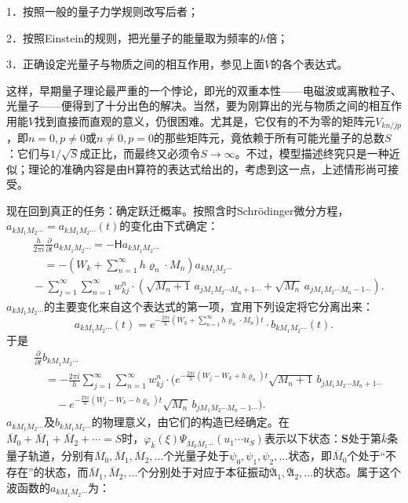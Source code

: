 \documentclass[fontsize=13pt,twoside,openany,headings=normal,parskip=false,bookmarkpackage=false,DIV=calc]{scrbook}
\begin{document}
1．按照一般的量子力学规则改写后者；

2．按照Einstein的规则，把光量子的能量取为频率的$h$倍；

3．正确设定光量子与物质之间的相互作用，参见上面$V$的各个表达式。

这样，早期量子理论最严重的一个悖论，即光的双重本性——电磁波或离散粒子、光量子——便得到了十分出色的解决。当然，要为刚算出的光与物质之间的相互作用能$V$找到直接而直观的意义，仍很困难。尤其是，它仅有的不为零的矩阵元$V_{kn/jp}$，即$n=0,\allowbreak p\ne0$或$n\ne0,\allowbreak p=0$的那些矩阵元，竟依赖于所有可能光量子的总数$S$：它们与$1/\sqrt S$成正比，而最终又必须令$S\longrightarrow\infty$。不过，模型描述终究只是一种近似；理论的准确内容是由$\mathsf{H}$算符的表达式给出的，考虑到这一点，上述情形尚可接受。

现在回到真正的任务：确定跃迁概率。按照含时Schrödinger微分方程，$a_{kM_1M_2\cdots}=a_{kM_1M_2\cdots}(t)$的变化由下式确定：
\begin{align*}
 &\frac h{2\pi i}\frac\partial{\partial t}a_{kM_1M_2\cdots}=-\mathsf{H}a_{kM_1M_2\cdots}\\
 &\quad=-\left(W_k+\sum_{n=1}^{\infty}h\varrho_n\cdot M_n\right)a_{kM_1M_2\cdots}\\
 &{}-\sum_{j=1}^{\infty}\sum_{n=1}^{\infty}w_{kj}^n\cdot
 \left(\sqrt{M_n+1}\,a_{jM_1M_2\cdots M_n+1\cdots}
 +\sqrt{M_n}\,a_{jM_1M_2\cdots M_n-1\cdots}\right).
\end{align*}\hypertarget{origpage-151}{}\label{origpage-151}$a_{kM_1M_2\cdots}$的主要变化来自这个表达式的第一项，宜用下列设定将它分离出来：
\[
 a_{kM_1M_2\cdots}(t)=e^{-\frac{2\pi i}{h}(W_k+\sum_{n=1}^{\infty}h\varrho_n\cdot M_n)t}\cdot b_{kM_1M_2\cdots}(t).
\]
于是
\begin{align*}
 &\frac\partial{\partial t}b_{kM_1M_2\cdots}\\
 &\quad=-\frac{2\pi i}{h}\sum_{j=1}^{\infty}\sum_{n=1}^{\infty}w_{kj}^n\cdot
 \bigl(e^{-\frac{2\pi i}{h}(W_j-W_k+h\varrho_n)t}\sqrt{M_n+1}\,b_{jM_1M_2\cdots M_n+1\cdots}\\
 &\qquad{}-e^{-\frac{2\pi i}{h}(W_j-W_k-h\varrho_n)t}\sqrt{M_n}\,b_{jM_1M_2\cdots M_n-1\cdots}\bigr).
\end{align*}
$a_{kM_1M_2\cdots}$及$b_{kM_1M_2\cdots}$的物理意义，由它们的构造已经确定。在$\overline M_0+\overline M_1+\overline M_2+\cdots=S$时，$\varphi_{\bar k}(\xi)\Psi_{\overline M_0\overline M_1\cdots}(u_1\cdots u_S)$表示以下状态：$\boldsymbol{S}$处于第$\bar k$条量子轨道，分别有$\overline M_0,\allowbreak \overline M_1,\allowbreak \overline M_2,\allowbreak \ldots$个光量子处于$\psi_0,\allowbreak \psi_1,\allowbreak \psi_2,\allowbreak \ldots$状态，即$\overline M_0$个处于“不存在”的状态，而$\overline M_1,\allowbreak \overline M_2,\allowbreak \ldots$个分别处于对应于本征振动$\overline{\mathfrak A}_1,\allowbreak \overline{\mathfrak A}_2,\allowbreak \ldots$的状态。属于这个波函数的$a_{kM_1M_2\cdots}$为：
\end{document}
